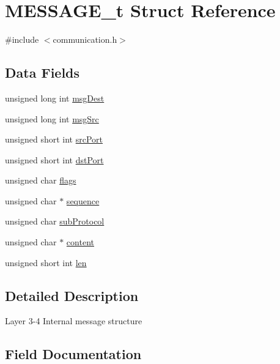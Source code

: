 \hypertarget{struct_m_e_s_s_a_g_e__t}{}\section{M\+E\+S\+S\+A\+G\+E\+\_\+t Struct Reference}
\label{struct_m_e_s_s_a_g_e__t}


{\ttfamily \#include $<$communication.\+h$>$}

\subsection*{Data Fields}
\begin{DoxyCompactItemize}
\item 
unsigned long int \hyperlink{struct_m_e_s_s_a_g_e__t_ac0e1cd3d93fc5a11ce7244a2d1823de2}{msg\+Dest}
\item 
unsigned long int \hyperlink{struct_m_e_s_s_a_g_e__t_a0fb10476a72a5a49fb537b51f91f28ee}{msg\+Src}
\item 
unsigned short int \hyperlink{struct_m_e_s_s_a_g_e__t_acf1bfdd1179c0d68cbfec3e5de623d70}{src\+Port}
\item 
unsigned short int \hyperlink{struct_m_e_s_s_a_g_e__t_a0e0462f3fde5eb310fe9d776dcef1d11}{dst\+Port}
\item 
unsigned char \hyperlink{struct_m_e_s_s_a_g_e__t_a78ac89a4a0f57ffa7c2ecf31749aa390}{flags}
\item 
unsigned char $\ast$ \hyperlink{struct_m_e_s_s_a_g_e__t_aae61c305bc218172c4fa25766255f5d8}{sequence}
\item 
unsigned char \hyperlink{struct_m_e_s_s_a_g_e__t_a5d41e832808c416e15e96b521c4ebfdf}{sub\+Protocol}
\item 
unsigned char $\ast$ \hyperlink{struct_m_e_s_s_a_g_e__t_a8cff7748b5b3118a34d99936238e78d8}{content}
\item 
unsigned short int \hyperlink{struct_m_e_s_s_a_g_e__t_a749ec55e4f272d503fc5fd0460c24fde}{len}
\end{DoxyCompactItemize}


\subsection{Detailed Description}
Layer 3-\/4 Internal message structure 

\subsection{Field Documentation}
\mbox{\label{struct_m_e_s_s_a_g_e__t_a8cff7748b5b3118a34d99936238e78d8}} 
